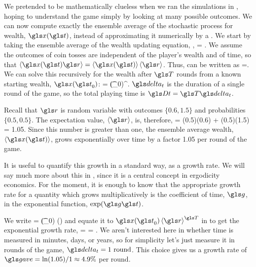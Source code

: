 We pretended to be mathematically clueless when we ran the simulations in , hoping to understand the game simply by looking at many possible outcomes. We can now compute exactly the ensemble average of the stochastic process for wealth, $\x(\t)$, instead of approximating it numerically by a \FEA. We start by taking the ensemble average of the wealth updating equation, ,
\be
\ave{\x(\t+\dt)} = \ave{\x(\t)\gr}.
\ee
We assume the outcomes of coin tosses are independent of the player's wealth and of time, so that $\ave{\x(\t)\gr} = \ave{\x(\t)}\ave{\gr}$. Thus,  can be written as
\be
\ave{\x(\t+\dt)}=\ave{\x(\t)}\ave{\gr}.
\ee
We can solve this recursively for the wealth after $\T$ rounds from a known starting wealth, $\x(\t_0)$:
\be
{} = \x(\t_0)\ave{\gr}^\T.
\ee
$\dt$ is the duration of a single round of the game, so the total playing time is $\Dt=\T\dt$.

Recall that $\gr$ is random variable with outcomes $\{0.6,1.5\}$ and probabilities $\{0.5,0.5\}$. The expectation value, $\ave{\gr}$, is, therefore,
\be
\ave{\gr} = (0.5)(0.6) + (0.5)(1.5) = 1.05.
\ee
Since this number is greater than one, the ensemble average wealth, $\ave{\x(\t)}$, grows exponentially over time by a factor 1.05 per round of the game.

It is useful to quantify this growth in a standard way, as a growth rate. We will say much more about this in , since it is a central concept in ergodicity economics. For the moment, it is enough to know that the appropriate growth rate for a quantity which grows multiplicatively is the coefficient of time, $\g$, in the exponential function, $\exp(\g\t)$.

We write
\be
{} = \x(\t_0) \exp(\ggave\Dt)
\ee
and equate it to $\x(\t_0)\ave{\gr}^\T$ in  to get the exponential growth rate,
\be
\ggave = \frac{\T\ln\ave{\gr}}{\Dt} = \frac{\ln\ave{\gr}}{\dt}.
\ee
We aren't interested here in whether time is measured in minutes, days, or years, so for simplicity let's just measure it in rounds of the game, \ie $\dt=1\text{ round}$. This choice gives us a growth rate of $\ggave = \ln(1.05)/1 \approx 4.9\%$ per round.

